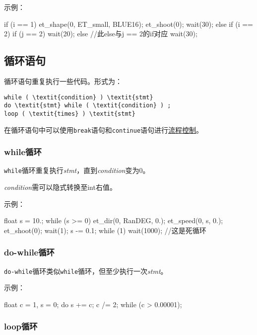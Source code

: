 \documentclass[UTF8]{ctexart}
\begin{document}
示例：

\begin{MUAvbt}
if (i == 1) {
	et_shape(0, ET_small, BLUE16);
	et_shoot(0);
	wait(30);
}
else if (i == 2)
	if (j == 2)
		wait(20);
	else			//此else与j == 2的if对应
		wait(30);
\end{MUAvbt}

\subsection{循环语句}

循环语句重复执行一些代码。形式为：

\begin{Verbatim}[frame=single, rulecolor=\color{magenta}, commandchars=\\\{\}]
while ( \textit{condition} ) \textit{stmt}
do \textit{stmt} while ( \textit{condition} ) ;
loop ( \textit{times} ) \textit{stmt}
\end{Verbatim}

在循环语句中可以使用\verb|break|语句和\verb|continue|语句进行\hyperref[break]{流程控制}。

\subsubsection{while循环}

\verb|while|循环重复执行\textit{stmt}，直到\textit{condition}变为0。

\textit{condition}需可以隐式转换至int右值。

示例：

\begin{MUAvbt}
float s = 10.;
while (s >= 0) {
	et_dir(0, RanDEG, 0.);
	et_speed(0, s, 0.);
	et_shoot(0);
	wait(1);
	s -= 0.1;
}
while (1)
	wait(1000);			//这是死循环
\end{MUAvbt}

\subsubsection{do-while循环}

\verb|do-while|循环类似\verb|while|循环，但至少执行一次\textit{stmt}。

示例：

\begin{MUAvbt}
float c = 1, s = 0;
do {
	s += c;
	c /= 2;
} while (c > 0.00001);
\end{MUAvbt}

\subsubsection{loop循环}
\end{document}

